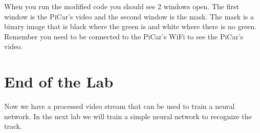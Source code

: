 \documentclass[11pt]{report}
\begin{document}
When you run the modified code you should see 2 windows open. The first window is the PiCar's video and the second window is the mask. The mask is a binary image that is black where the green is and white where there is no green. Remember you need to be connected to the PiCar's WiFi to see the PiCar's video.


\chapter{End of the Lab}
Now we have a processed video stream that can be used to train a neural network. In the next lab we will train a simple neural network to recognize the track.
\end{document}
